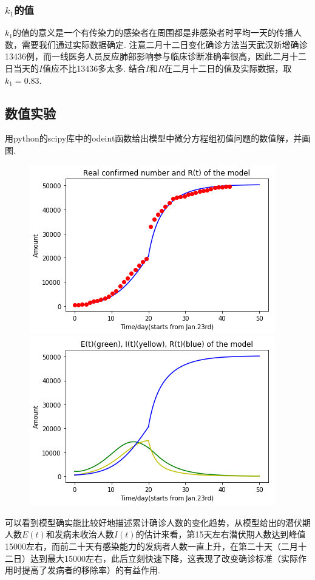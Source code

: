 \documentclass[UTF8]{ctexart}
\begin{document}
			\subsubsection{$k_1$的值}
				$k_1$的值的意义是一个有传染力的感染者在周围都是非感染者时平均一天的传播人数，需要我们通过实际数据确定. 注意二月十二日变化确诊方法当天武汉新增确诊13436例，而一线医务人员反应肺部影响参与临床诊断准确率很高，因此二月十二日当天的$I$值应不比13436多太多. 结合$I$和$R$在二月十二日的值及实际数据，取$k_1 = 0.83$.
			
		\subsection{数值实验}
			用python的scipy库中的odeint函数给出模型中微分方程组初值问题的数值解，并画图.
			\begin{figure}
				\includegraphics[scale=0.37]{real_and_R.png}
				\includegraphics[scale=0.37]{EIR.png}
			\end{figure}
		
			可以看到模型确实能比较好地描述累计确诊人数的变化趋势，从模型给出的潜伏期人数$E(t)$和发病未收治人数$I(t)$的估计来看，第15天左右潜伏期人数达到峰值15000左右，而前二十天有感染能力的发病者人数一直上升，在第二十天（二月十二日）达到最大15000左右，此后立刻快速下降，这表现了改变确诊标准（实际作用时提高了发病者的移除率）的有益作用.
	
\end{document}
